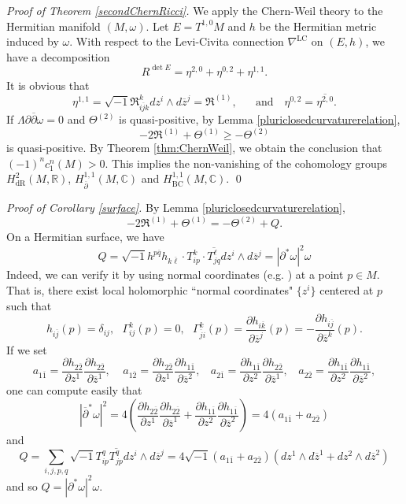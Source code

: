 \documentclass[12pt]{amsart}
\newcommand\bp{{\bar\partial}}
\theoremstyle{plain}
\theoremstyle{definition}
\newcommand{\sq}{\sqrt{-1}}
\newcommand{\p}{\partial}
\renewcommand{\bar}{\overline}
\newcommand{\beq}{\begin{equation}}
\newcommand{\eeq}{\end{equation}}
\newcommand{\qtq}[1]{\quad\mbox{#1}\quad}
\renewcommand{\bp}{\bar{\partial}}
\renewcommand{\>}{\rightarrow}
\newcommand{\ssR}{{\mathfrak R}}
\newcommand{\C}{{\mathbb C}}
\newcommand{\R}{{\mathbb R}}
\numberwithin{equation}{section} %
\begin{document}
		
		\noindent \emph{Proof of Theorem \ref{secondChernRicci}.}	We apply the Chern-Weil theory to the Hermitian manifold
		$(M,\omega)$. Let $E=T^{1,0}M$ and $h$ be the Hermitian metric  induced by	$\omega$. With respect to the Levi-Civita connection $\nabla^{\mathrm{LC}}$
		on $(E,h)$, we have a decomposition $$ R^{\det
			E}=\eta^{2,0}+\eta^{0,2}+\eta^{1,1}.$$  It is obvious that
		\beq \eta^{1,1}= \sq \mathfrak R_{i\bar j k}^kdz^i\wedge d\bar
		z^j=\mathfrak{R}^{(1)},\ \ \
		\qtq{and}
		\eta^{0,2}=\bar{\eta^{2,0}}.\eeq
		If $\Lambda\p\bp\omega=0$ and $\Theta^{(2)}$ is quasi-positive, by Lemma \ref{pluriclosedcurvaturerelation},
		$$-2\ssR^{(1)}+\Theta^{(1)}\geq -\Theta^{(2)}$$
		is quasi-positive. By Theorem \ref{thm:ChernWeil}, we obtain the conclusion that $(-1)^n c_1^n(M)>0$. This implies the non-vanishing of the cohomology groups $H^2_{\mathrm{dR}}(M,\R)$, $H^{1,1}_{\bp}(M,\C)$ and $H^{1,1}_{\mathrm{BC}}(M,\C)$. \qed 
		
		
		\baselineskip
		
		
		
		\noindent \emph{Proof of Corollary \ref{surface}.} By Lemma \ref{pluriclosedcurvaturerelation},
		$$-2\ssR^{(1)}+\Theta^{(1)}= -\Theta^{(2)}+Q.$$
		On a Hermitian surface, we have 
		\beq Q=\sq h^{p\bar q}
		h_{k \bar \ell}\cdot T_{ip}^k\cdot \bar {T_{jq}^\ell} dz^i\wedge d\bar
		z^j=\left|\partial^{*} \omega\right|^2 \omega\eeq 
		 Indeed, we can verify it by using normal coordinates (e.g. \cite[Lemma~3.4]{LiuYang2017}) at a point $p\in M$. That is,  there exist local holomorphic ``normal
		coordinates" $\{z^i\}$ centered at $p$ such that \beq h_{i\bar
			j}(p)=\delta_{ij},\ \ \ \Gamma_{ij}^k(p)=0,\ \ \ \Gamma_{\bar j
			i}^k(p)=\frac{\p h_{i\bar k}}{\p \bar z^j}(p)=-\frac{\p h_{i\bar
				j}}{\p\bar z^k}(p).\eeq
		If we set 
		\beq a_{1\bar 1}=\frac{\p h_{2\bar 2}}{\p z^1}\frac{\p h_{2\bar 2}}{\p \bar z^1},\ \ \ \ \ a_{1\bar 2}=\frac{\p h_{2\bar 2}}{\p z^1}\frac{\p h_{1\bar 1}}{\p \bar z^2},\ \ \ \ a_{2\bar 1}=\frac{\p h_{1\bar 1}}{\p z^2}\frac{\p h_{2\bar 2}}{\p \bar z^1},\ \ \ \ a_{2\bar 2}=\frac{\p h_{1\bar 1}}{\p z^2}\frac{\p h_{1\bar 1}}{\p \bar z^2}, \eeq 	
		one can compute easily that 	
		\beq |\bp^*\omega|^2=4\left(\frac{\p h_{2\bar 2}}{\p z^1}\frac{\p h_{2\bar 2}}{\p \bar z^1}+\frac{\p h_{1\bar 1}}{\p z^2}\frac{\p h_{1\bar 1}}{\p \bar z^2}\right) =4(a_{1\bar 1}+a_{2\bar 2})\eeq 
		and 
		\beq Q=\sum_{i,j,p, q}\sqrt{-1}  T_{i p}^q \overline{T_{j p}^q} d z^i \wedge d \bar{z}^j=4\sq (a_{1\bar 1}+a_{2\bar 2})(dz^1\wedge d\bar z^1+dz^2\wedge d\bar z^2) \eeq
		and so $Q=\left|\partial^{*} \omega\right|^2 \omega$. \\
		
\end{document}
